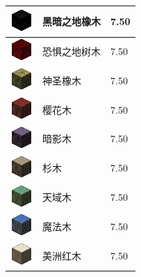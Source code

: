 \documentclass[UTF8]{ctexart}
\begin{document}
\begin{longtable}[]{|p{1cm}|p{8cm}|p{1.5cm}|}
	\hline
	\includegraphics{.workspace/icons/abyssalcraft/abyssalcraft__dltlog2__0.png} & 黑暗之地橡木 &7.50\\
	\hline
	\includegraphics{.workspace/icons/abyssalcraft/abyssalcraft__dreadlog__0.png} & 恐惧之地树木 &7.50\\
	\hline
	\includegraphics{.workspace/icons/biomesoplenty/biomesoplenty__log_0__4.png} & 神圣橡木 &7.50\\
	\hline
	\includegraphics{.workspace/icons/biomesoplenty/biomesoplenty__log_0__5.png} & 樱花木 &7.50\\
	\hline
	\includegraphics{.workspace/icons/biomesoplenty/biomesoplenty__log_0__6.png} & 暗影木 &7.50\\
	\hline
	\includegraphics{.workspace/icons/biomesoplenty/biomesoplenty__log_0__7.png} & 杉木 &7.50\\
	\hline
	\includegraphics{.workspace/icons/biomesoplenty/biomesoplenty__log_1__4.png} & 天域木 &7.50\\
	\hline
	\includegraphics{.workspace/icons/biomesoplenty/biomesoplenty__log_1__5.png} & 魔法木 &7.50\\
	\hline
	\includegraphics{.workspace/icons/biomesoplenty/biomesoplenty__log_1__6.png} & 美洲红木 &7.50\\

\end{longtable}
\end{document}
